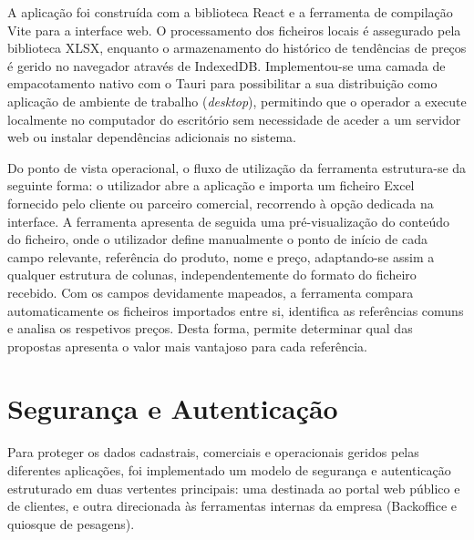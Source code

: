 A aplicação foi construída com a biblioteca React e a ferramenta de compilação Vite para a interface web. O processamento dos ficheiros locais é assegurado pela biblioteca XLSX, enquanto o armazenamento do histórico de tendências de preços é gerido no navegador através de IndexedDB. Implementou-se uma camada de empacotamento nativo com o Tauri para possibilitar a sua distribuição como aplicação de ambiente de trabalho (\textit{desktop}), permitindo que o operador a execute localmente no computador do escritório sem necessidade de aceder a um servidor web ou instalar dependências adicionais no sistema.

Do ponto de vista operacional, o fluxo de utilização da ferramenta estrutura-se da seguinte forma: o utilizador abre a aplicação e importa um ficheiro Excel fornecido pelo cliente ou parceiro comercial, recorrendo à opção dedicada na interface. A ferramenta apresenta de seguida uma pré-visualização do conteúdo do ficheiro, onde o utilizador define manualmente o ponto de início de cada campo relevante, referência do produto, nome e preço, adaptando-se assim a qualquer estrutura de colunas, independentemente do formato do ficheiro recebido. Com os campos devidamente mapeados, a ferramenta compara automaticamente os ficheiros importados entre si, identifica as referências comuns e analisa os respetivos preços. Desta forma, permite determinar qual das propostas apresenta o valor mais vantajoso para cada referência.

\section{Segurança e Autenticação}\label{sec:seguranca}

Para proteger os dados cadastrais, comerciais e operacionais geridos pelas diferentes aplicações, foi implementado um modelo de segurança e autenticação estruturado em duas vertentes principais: uma destinada ao portal web público e de clientes, e outra direcionada às ferramentas internas da empresa (Backoffice e quiosque de pesagens).

